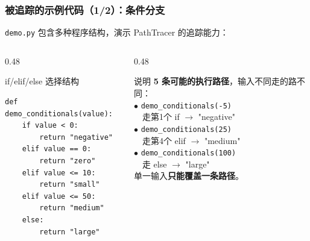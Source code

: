 \documentclass[presentation,aspectratio=169]{ctexbeamer}
\begin{document}
\begin{frame}[fragile]
\frametitle{被追踪的示例代码（1/2）：条件分支}
{\footnotesize \texttt{demo.py} 包含多种程序结构，演示 PathTracer 的追踪能力：}

\vspace{0.1cm}
\begin{columns}[T]
\begin{column}{0.48\textwidth}
\begin{block}{\scriptsize if/elif/else 选择结构}
{\scriptsize
\begin{verbatim}
def demo_conditionals(value):
    if value < 0:
        return "negative"
    elif value == 0:
        return "zero"
    elif value <= 10:
        return "small"
    elif value <= 50:
        return "medium"
    else:
        return "large"
\end{verbatim}}
\end{block}
\end{column}
\begin{column}{0.48\textwidth}
\begin{block}{\scriptsize 说明}
{\scriptsize
\textbf{5 条可能的执行路径}，输入不同走的路不同：\\[3pt]
$\bullet$ \texttt{demo\_conditionals(-5)}\\
~~走第1个 if $\rightarrow$ "negative"\\[2pt]
$\bullet$ \texttt{demo\_conditionals(25)}\\
~~走第4个 elif $\rightarrow$ "medium"\\[2pt]
$\bullet$ \texttt{demo\_conditionals(100)}\\
~~走 else $\rightarrow$ "large"\\[3pt]
单一输入\textbf{只能覆盖一条路径}。}
\end{block}
\end{column}
\end{columns}
\end{frame}

\end{document}
